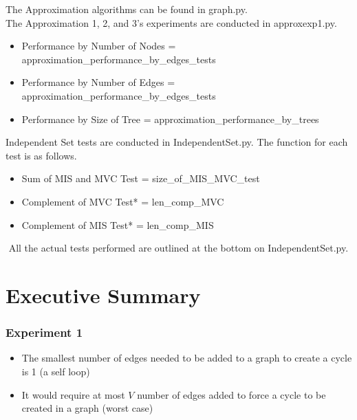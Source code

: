 \documentclass[12pt]{article}
\begin{document}

The Approximation algorithms can be found in graph.py. \\
The Approximation 1, 2, and 3's experiments are conducted in approxexp1.py.
\\
\begin{itemize}
    \item Performance by Number of Nodes = approximation\_performance\_by\_edges\_tests\(\)
    \item Performance by Number of Edges = approximation\_performance\_by\_edges\_tests\(\)
    \item Performance by Size of Tree = approximation\_performance\_by\_trees\(\)
\end{itemize}

Independent Set tests are conducted in IndependentSet.py.
The function for each test is as follows.
\begin{itemize}
    \item Sum of MIS and MVC Test = size\_of\_MIS\_MVC\_test\(\)
    \item Complement of MVC Test* = len\_comp\_MVC\(\)
    \item Complement of MIS Test* = len\_comp\_MIS\(\)
\end{itemize}
$ $
\newline
All the actual tests performed are outlined at the bottom on IndependentSet.py.



\newpage
\section{Executive Summary}

\subsubsection{Experiment 1}
\begin{itemize}
    \item The smallest number of edges needed to be added to a graph to create a cycle is 1 (a self loop)
    \item It would require at most $V$ number of edges added to force a cycle to be created in a graph (worst case) 
  \end{itemize}
\end{document}
